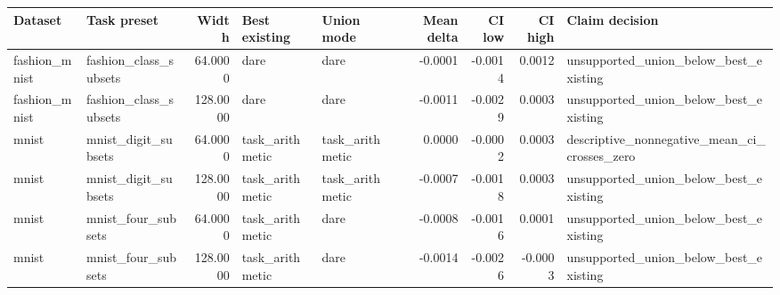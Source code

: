 \begin{tabular}{llrllrrrl}
\toprule
Dataset & Task preset & Width & Best existing & Union mode & Mean delta & CI low & CI high & Claim decision \\
\midrule
fashion\_mnist & fashion\_class\_subsets & 64.0000 & dare & dare & -0.0001 & -0.0014 & 0.0012 & unsupported\_union\_below\_best\_existing \\
fashion\_mnist & fashion\_class\_subsets & 128.0000 & dare & dare & -0.0011 & -0.0029 & 0.0003 & unsupported\_union\_below\_best\_existing \\
mnist & mnist\_digit\_subsets & 64.0000 & task\_arithmetic & task\_arithmetic & 0.0000 & -0.0002 & 0.0003 & descriptive\_nonnegative\_mean\_ci\_crosses\_zero \\
mnist & mnist\_digit\_subsets & 128.0000 & task\_arithmetic & task\_arithmetic & -0.0007 & -0.0018 & 0.0003 & unsupported\_union\_below\_best\_existing \\
mnist & mnist\_four\_subsets & 64.0000 & task\_arithmetic & dare & -0.0008 & -0.0016 & 0.0001 & unsupported\_union\_below\_best\_existing \\
mnist & mnist\_four\_subsets & 128.0000 & task\_arithmetic & dare & -0.0014 & -0.0026 & -0.0003 & unsupported\_union\_below\_best\_existing \\
\bottomrule
\end{tabular}
